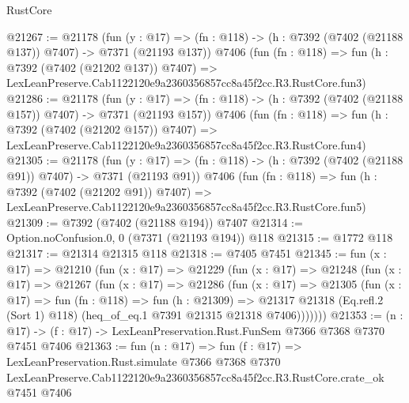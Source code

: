 \begin{lexlean}{RustCore}
\begin{coremodule}
@21267 := @21178
    (fun (y : @17) => (fn : @118) -> (h : @7392 (@7402 (@21188 @137)) @7407) -> @7371 (@21193 @137))
    @7406
    (fun (fn : @118) =>
    fun (h : @7392 (@7402 (@21202 @137)) @7407) =>
    LexLeanPreserve.Cab1122120e9a2360356857cc8a45f2cc.R3.RustCore.fun3)
@21286 := @21178
    (fun (y : @17) => (fn : @118) -> (h : @7392 (@7402 (@21188 @157)) @7407) -> @7371 (@21193 @157))
    @7406
    (fun (fn : @118) =>
    fun (h : @7392 (@7402 (@21202 @157)) @7407) =>
    LexLeanPreserve.Cab1122120e9a2360356857cc8a45f2cc.R3.RustCore.fun4)
@21305 := @21178
    (fun (y : @17) => (fn : @118) -> (h : @7392 (@7402 (@21188 @91)) @7407) -> @7371 (@21193 @91))
    @7406
    (fun (fn : @118) =>
    fun (h : @7392 (@7402 (@21202 @91)) @7407) =>
    LexLeanPreserve.Cab1122120e9a2360356857cc8a45f2cc.R3.RustCore.fun5)
@21309 := @7392 (@7402 (@21188 @194)) @7407
@21314 := Option.noConfusion.{0, 0} (@7371 (@21193 @194)) @118
@21315 := @1772 @118
@21317 := @21314 @21315 @118
@21318 := @7405 @7451
@21345 := fun (x : @17) =>
  @21210
    (fun (x : @17) =>
    @21229
      (fun (x : @17) =>
      @21248
        (fun (x : @17) =>
        @21267
          (fun (x : @17) =>
          @21286
            (fun (x : @17) =>
            @21305
              (fun (x : @17) =>
              fun (fn : @118) =>
              fun (h : @21309) =>
              @21317
                @21318
                (Eq.refl.{2} (Sort 1) @118)
                (heq_of_eq.{1} @7391 @21315 @21318 @7406)))))))
@21353 := (n : @17) -> (f : @17) -> LexLeanPreservation.Rust.FunSem @7366 @7368 @7370 @7451 @7406
@21363 := fun (n : @17) =>
  fun (f : @17) =>
  LexLeanPreservation.Rust.simulate
    @7366
    @7368
    @7370
    LexLeanPreserve.Cab1122120e9a2360356857cc8a45f2cc.R3.RustCore.crate_ok
    @7451
    @7406
\end{coremodule}
\end{lexlean}
